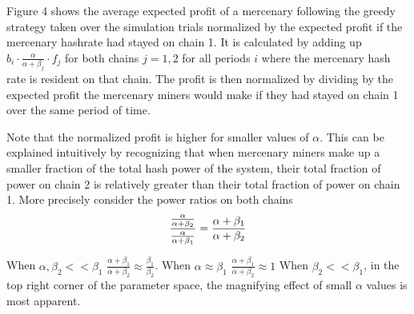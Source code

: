 \documentclass[10pt, preprint]{aastex}
\begin{document}
Figure 4 shows the average expected profit of a mercenary following the greedy strategy taken over the simulation trials normalized by the expected profit if the mercenary hashrate had stayed on chain 1.  It is calculated by adding up $b_i \cdot \frac{\alpha}{\alpha + \beta_j} \cdot f_j$ for both chains $j=1,2$ for all periods $i$ where the mercenary hash rate is resident on that chain.  The profit is then normalized by dividing by the expected profit the mercenary miners would make if they had stayed on chain 1 over the same period of time.  

Note that the normalized profit is higher for smaller values of $\alpha$.  This can be explained intuitively by recognizing that when mercenary miners make up a smaller fraction of the total hash power of the system, their total fraction of power on chain 2 is relatively greater than their total fraction of power on chain 1.  More precisely consider the power ratios on both chains
$$
\frac{ \frac{\alpha}{\alpha + \beta_2}}{\frac{\alpha}{\alpha + \beta_1}} = \frac{\alpha + \beta_1}{\alpha + \beta_2}\\ 
$$

When $\alpha, \beta_2 << \beta_1$ $\frac{\alpha + \beta_1}{\alpha + \beta_2} \approx \frac{\beta_1}{\beta_2}$.  When $\alpha \approx \beta_1$ $\frac{\alpha + \beta_1}{\alpha + \beta_2} \approx 1$   When $\beta_2 << \beta_1$, in the top right corner of the parameter space, the magnifying effect of small $\alpha$ values is most apparent.
\end{document}
